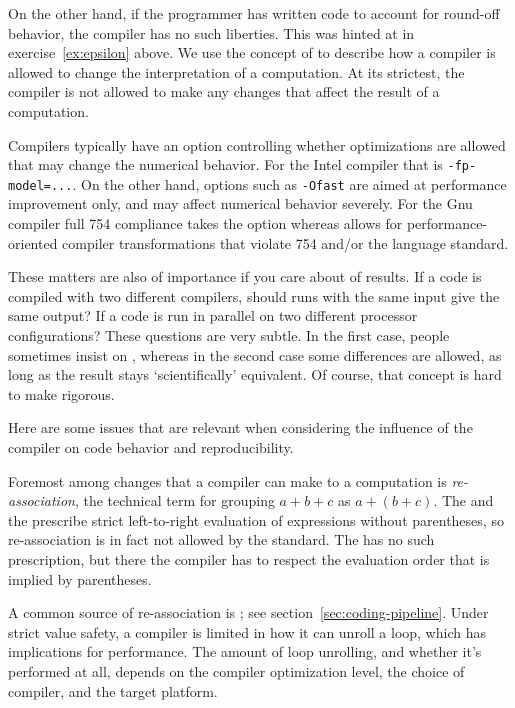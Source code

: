 On the other hand, if the programmer has written code to account for
round-off behavior, the compiler has no such liberties. This was
hinted at in exercise~\ref{ex:epsilon} above.
We use the concept of  to describe
how a compiler is allowed to change the interpretation of a computation.
At its strictest, the compiler is not allowed
to make any changes that affect the result of a
computation.

Compilers typically have an option controlling whether optimizations
are allowed that may change the numerical behavior. For the Intel
compiler that is \texttt{-fp-model=...}. On the other hand, options
such as \texttt{-Ofast} are aimed at performance improvement only, and
may affect numerical behavior severely.  For the Gnu compiler full
754 compliance takes the option  whereas
 allows for performance-oriented compiler
transformations that violate 754 and/or the language standard.

These matters are also of importance if you care about
 of results. If a code is compiled with 
two different compilers, should runs with the same input give
the same output? If a code is run in parallel on two different 
processor configurations? These questions are very subtle.
In the first case, people sometimes insist on 
, whereas
in the second case some differences are allowed, as long
as the result stays `scientifically' equivalent. Of course,
that concept is hard to make rigorous.

Here are some issues that are relevant
when considering the influence of the compiler
on code behavior and reproducibility.

Foremost among changes that a compiler can
make to a computation is \emph{re-association}, the technical
term for grouping $a+b+c$ as $a+(b+c)$. The  and the  prescribe
strict left-to-right evaluation of expressions without parentheses, so
re-association is in fact not allowed by the standard. The
 has no such prescription,
but there the compiler has to respect the evaluation order that is
implied by parentheses.

A common source of re-association is ; see
section~\ref{sec:coding-pipeline}. Under strict value safety,
a compiler is limited in how it can unroll a loop, which has implications
for performance. The amount of loop unrolling,
and whether it's performed at all, depends on the compiler optimization level,
the choice of compiler, and the target platform.

